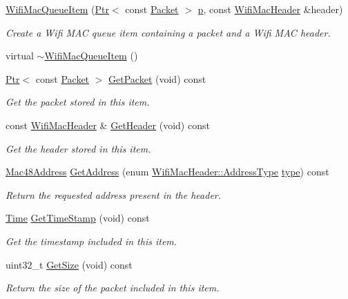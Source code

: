\begin{DoxyCompactItemize}
\item 
\hyperlink{classns3_1_1WifiMacQueueItem_a822800d7fc28dd06d82e613676b0ca8e}{Wifi\+Mac\+Queue\+Item} (\hyperlink{classns3_1_1Ptr}{Ptr}$<$ const \hyperlink{classns3_1_1Packet}{Packet} $>$ \hyperlink{lte__link__budget__x2__handover__measures_8m_ac9de518908a968428863f829398a4e62}{p}, const \hyperlink{classns3_1_1WifiMacHeader}{Wifi\+Mac\+Header} \&header)
\begin{DoxyCompactList}\small\item\em Create a Wifi M\+AC queue item containing a packet and a Wifi M\+AC header. \end{DoxyCompactList}\item 
virtual \hyperlink{classns3_1_1WifiMacQueueItem_a7f2bb4877ce7a5257a9fb25e7389b76a}{$\sim$\+Wifi\+Mac\+Queue\+Item} ()
\item 
\hyperlink{classns3_1_1Ptr}{Ptr}$<$ const \hyperlink{classns3_1_1Packet}{Packet} $>$ \hyperlink{classns3_1_1WifiMacQueueItem_ae20827a07fef719e8b7bf53f62908e12}{Get\+Packet} (void) const 
\begin{DoxyCompactList}\small\item\em Get the packet stored in this item. \end{DoxyCompactList}\item 
const \hyperlink{classns3_1_1WifiMacHeader}{Wifi\+Mac\+Header} \& \hyperlink{classns3_1_1WifiMacQueueItem_a6fbd9c2d4350c4fb56893dd826bd96a4}{Get\+Header} (void) const 
\begin{DoxyCompactList}\small\item\em Get the header stored in this item. \end{DoxyCompactList}\item 
\hyperlink{classns3_1_1Mac48Address}{Mac48\+Address} \hyperlink{classns3_1_1WifiMacQueueItem_aa54138454790593e7b4d3053ccdb1755}{Get\+Address} (enum \hyperlink{classns3_1_1WifiMacHeader_a17406db48973a8e8fb6d961dd35154fe}{Wifi\+Mac\+Header\+::\+Address\+Type} \hyperlink{visualizer-ideas_8txt_add98db9e15e2a58cf2b57623e7aa893a}{type}) const 
\begin{DoxyCompactList}\small\item\em Return the requested address present in the header. \end{DoxyCompactList}\item 
\hyperlink{classns3_1_1Time}{Time} \hyperlink{classns3_1_1WifiMacQueueItem_a36cb82e731c3e1027c36743258694d11}{Get\+Time\+Stamp} (void) const 
\begin{DoxyCompactList}\small\item\em Get the timestamp included in this item. \end{DoxyCompactList}\item 
uint32\+\_\+t \hyperlink{classns3_1_1WifiMacQueueItem_a5913c3e240141b6206ae15b024f0e58a}{Get\+Size} (void) const 
\begin{DoxyCompactList}\small\item\em Return the size of the packet included in this item. \end{DoxyCompactList}\end{DoxyCompactItemize}
